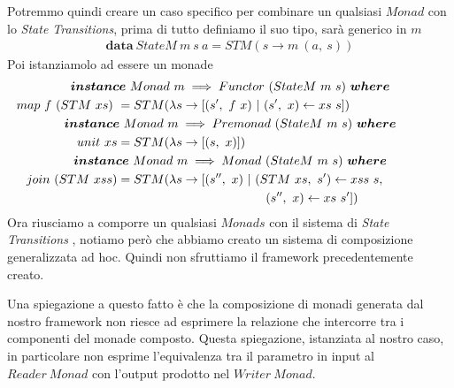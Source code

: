 Potremmo quindi creare un caso specifico per combinare un qualsiasi $Monad$ con
lo \textit{State Transitions}, prima di tutto definiamo il suo tipo, sarà generico
in $m$
\begin{align*}
  \bm{data}\ StateM\ m\ s\ a = STM(s \to m\ (a,\ s))
\end{align*}
Poi istanziamolo ad essere un monade
\begin{align*}
  \classdef{\bm{instance}\ Monad\ m \implies Functor\ (StateM\ m\ s)\ \bm{where}}
  map\ f\ (STM\ xs)\ &= STM(\lambda s \to [(s',\ f\ x)\ |\ (s',\ x) \leftarrow xs\ s])\\
  \classdef{\bm{instance}\ Monad\ m \implies Premonad\ (StateM\ m\ s)\ \bm{where}}
  unit\ xs &= STM(\lambda s \to [(s,\ x)])\\
  \classdef{\bm{instance}\ Monad\ m \implies Monad\ (StateM\ m\ s)\ \bm{where}}
  join\ (STM\ xss) &= STM(\lambda s \to [(s'',\ x)\ |\ (STM\ xs,\ s') \leftarrow xss\ s, \\
                   &\qquad\qquad\qquad\qquad\qquad\qquad(s'',\ x) \leftarrow xs\ s'])\\
\end{align*}
Ora riusciamo a comporre un qualsiasi $Monads$ con il sistema di \textit{State Transitions}
, notiamo però che abbiamo creato un sistema di composizione generalizzata ad hoc.
Quindi non sfruttiamo il framework precedentemente creato.\newline

Una spiegazione a questo fatto è che la composizione di monadi generata dal
nostro framework non riesce ad esprimere la relazione che intercorre tra i
componenti del monade composto.
Questa spiegazione, istanziata al nostro caso, in particolare non esprime
l'equivalenza tra il parametro in input al $Reader\ Monad$ con l'output prodotto
nel $Writer\ Monad$.\newline
